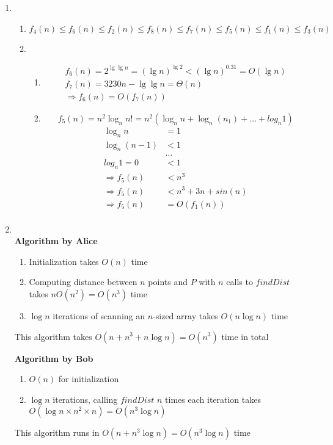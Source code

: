 \documentclass{article}
\begin{document}
\begin{enumerate}[leftmargin=\labelsep]
  \item \begin{enumerate}
      \item $f_4(n) \le f_6(n) \le f_2(n) \le f_8(n) \le f_7(n) \le f_5(n) \le f_1(n) \le f_3(n)$
      \item \begin{enumerate}
        \item \begin{gather*}
            f_6(n) = 2^{\lg \lg n} = (\lg n)^{\lg 2} < (\lg n)^{0.31} = O(\lg n) \\
            f_7(n) = 3230n - \lg \lg n = \Theta(n) \\
            \Rightarrow f_6(n) = O(f_7(n))
        \end{gather*}
      \item
        \[
          f_5(n) = n^2 \log_n n! = n^2 (\log_n n + \log_n (n_1) + \dots + log_n 1) 
        \]
         \begin{align*}
            \log_n n & = 1 \\
            \log_n (n-1) & < 1 \\
            & \dots \\
            log_n 1 = 0 & < 1 \\
            \Rightarrow f_5(n) & < n^3 \\
            \Rightarrow f_5(n) & < n^3 + 3n + sin(n) \\
            \Rightarrow f_5(n) &= O(f_1(n)) \\
        \end{align*} 
      \end{enumerate}
  \end{enumerate}

  \item\ \\
    \textbf{Algorithm by Alice}
    \begin{enumerate}
      \item Initialization takes $O(n)$ time
      \item Computing distance between $n$ points and $P$ with $n$ calls to $findDist$ takes $nO(n^2) = O(n^3)$ time
      \item $\log n$ iterations of scanning an $n$-sized array takes $O(n\log n)$ time
    \end{enumerate}
    This algorithm takes $O(n + n^3 + n\log n) = O(n^3)$ time in total

    \textbf{Algorithm by Bob}
    \begin{enumerate}
      \item $O(n)$ for initialization
      \item $\log n$ iterations, calling $findDist$ $n$ times each iteration takes $O(\log n \times n^2 \times n) = O(n^3 \log n)$
    \end{enumerate}
    This algorithm runs in $O(n + n^3 \log n) = O(n^3 \log n)$ time


\end{enumerate}
\end{document}
